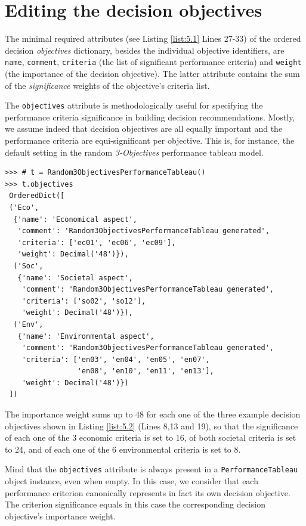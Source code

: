 \section{Editing the decision objectives}
\label{sec:5.3}

The minimal required attributes (see Listing \ref{list:5.1} Lines 27-33) of the ordered decision \emph{objectives} dictionary, besides the individual objective identifiers, are \texttt{name}, \texttt{comment}, \texttt{criteria} (the list of significant performance criteria) and \texttt{weight} (the importance of the decision objective). The latter attribute contains the sum of the \emph{significance} weights of the objective's criteria list. 

The \texttt{objectives} attribute is methodologically useful for specifying the performance criteria significance in building decision recommendations. Mostly, we assume indeed that decision objectives are all equally important and the performance criteria are equi-significant per objective. This is, for instance, the default setting in the random \emph{3-Objectives} performance tableau model.

\begin{lstlisting}[caption={Example of decision objectives' description},label=list:5.2]
>>> # t = Random3ObjectivesPerformanceTableau()
>>> t.objectives
 OrderedDict([
 ('Eco',
  {'name': 'Economical aspect',
   'comment': 'Random3ObjectivesPerformanceTableau generated',
   'criteria': ['ec01', 'ec06', 'ec09'],
   'weight': Decimal('48')}),
  ('Soc',
   {'name': 'Societal aspect',
    'comment': 'Random3ObjectivesPerformanceTableau generated',
    'criteria': ['so02', 'so12'],
    'weight': Decimal('48')}),
  ('Env',
   {'name': 'Environmental aspect',
    'comment': 'Random3ObjectivesPerformanceTableau generated',
    'criteria': ['en03', 'en04', 'en05', 'en07',
                 'en08', 'en10', 'en11', 'en13'],
    'weight': Decimal('48')})
 ])
\end{lstlisting}

The importance weight sums up to 48 for each one of the three example decision objectives shown in Listing \ref{list:5.2} (Lines 8,13 and 19), so that the significance of each one of the 3 economic criteria is set to 16, of both societal criteria is set to 24, and of each one of the 6 environmental criteria is set to 8.

Mind that the \texttt{objectives} attribute is always present in a \texttt{PerformanceTableau} object instance, even when empty. In this case, we consider that each performance criterion canonically represents in fact its own decision objective. The criterion significance equals in this case the corresponding decision objective's importance weight.

